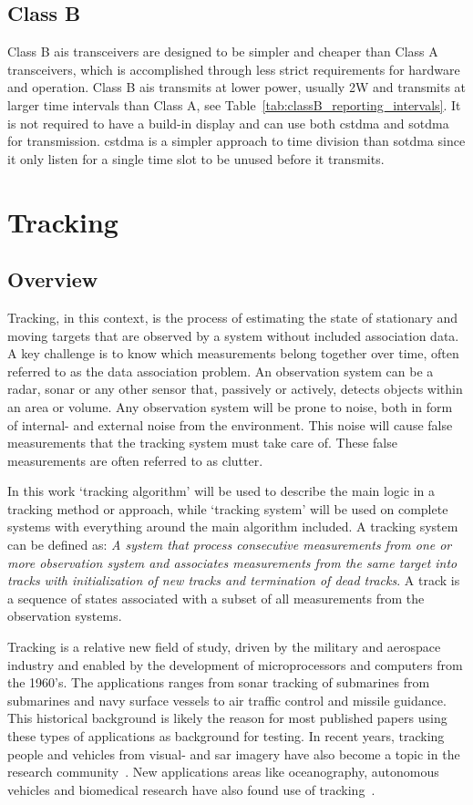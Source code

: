 \subsection{Class B}
Class B \gls{ais} transceivers are designed to be simpler and cheaper than Class A transceivers, which is accomplished through less strict requirements for hardware and operation. Class B \gls{ais} transmits at lower power, usually 2W and transmits at larger time intervals than Class A, see Table~\ref{tab:classB_reporting_intervals}. It is not required to have a build-in display and can use both \gls{cstdma} and \gls{sotdma} for transmission. \gls{cstdma} is a simpler approach to time division than \gls{sotdma} since it only listen for a single time slot to be unused before it transmits.

\section{Tracking}
\subsection{Overview}
Tracking, in this context, is the process of estimating the state of stationary and moving targets that are observed by a system without included association data. A key challenge is to know which measurements belong together over time, often referred to as the data association problem. An observation system can be a radar, sonar or any other sensor that, passively or actively, detects objects within an area or volume. Any observation system will be prone to noise, both in form of internal- and external noise from the environment. This noise will cause false measurements that the tracking system must take care of. These false measurements are often referred to as clutter.

In this work `tracking algorithm' will be used to describe the main logic in a tracking method or approach, while `tracking system' will be used on complete systems with everything around the main algorithm included. A tracking system can be defined as: \emph{A system that process consecutive measurements from one or more observation system and associates measurements from the same target into tracks with initialization of new tracks and termination of dead tracks}. A track is a sequence of states associated with a subset of all measurements from the observation systems. 

Tracking is a relative new field of study, driven by the military and aerospace industry and enabled by the development of microprocessors and computers from the 1960's. The applications ranges from sonar tracking of submarines from submarines and navy surface vessels to air traffic control and missile guidance. This historical background is likely the reason for most published papers using these types of applications as background for testing. In recent years, tracking people and vehicles from visual- and \gls{sar} imagery have also become a topic in the research community~\cite{Carthel2007,Carthel2007a,Coraluppi2000}. New applications areas like oceanography, autonomous vehicles and biomedical research have also found use of tracking~\cite{Wolf2010,Svec2014,Vo2015}.

